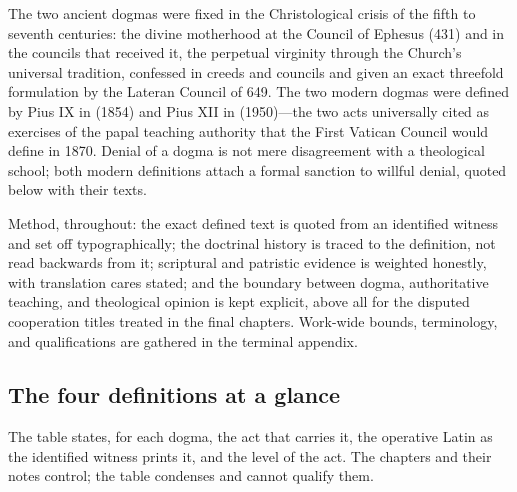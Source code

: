 The two ancient dogmas were fixed in the Christological crisis of the
fifth to seventh centuries: the divine motherhood at the Council of
Ephesus (431) and in the councils that received it, the perpetual
virginity through the Church's universal tradition, confessed in creeds
and councils and given an exact threefold formulation by the Lateran
Council of 649. The two modern dogmas were defined  by
Pius IX in  (1854) and Pius XII in
 (1950)---the two acts universally cited as
exercises of the papal teaching authority that the First Vatican Council
would define in 1870. Denial of a dogma is not mere disagreement with a
theological school; both modern definitions attach a formal sanction to
willful denial, quoted below with their texts.

Method, throughout: the exact defined text is quoted from an identified
witness and set off typographically; the doctrinal history is traced to
the definition, not read backwards from it; scriptural and patristic
evidence is weighted honestly, with translation cares stated; and the
boundary between dogma, authoritative teaching, and theological opinion is
kept explicit, above all for the disputed cooperation titles treated in
the final chapters. Work-wide bounds, terminology, and qualifications are
gathered in the terminal appendix.

\subsection*{The four definitions at a glance}

The table states, for each dogma, the act that carries it, the operative
Latin as the identified witness prints it, and the level of the act. The
chapters and their notes control; the table condenses and cannot qualify
them.


